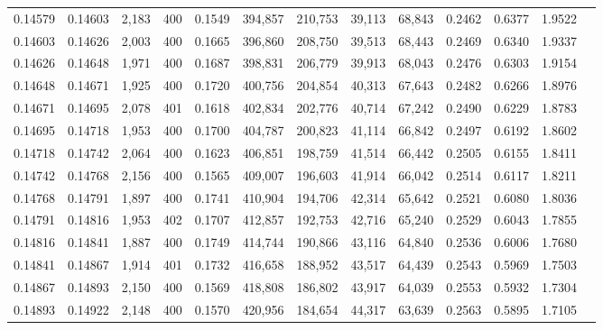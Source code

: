 \begin{tabular}{rrrrrrrrrrrrr}
0.14579 & 0.14603 &  2,183 &   400 &                                     0.1549 & 394,857 & 210,753 &  39,113 &  68,843 & 0.2462 & 0.6377 & 1.9522 \\
0.14603 & 0.14626 &  2,003 &   400 &                                     0.1665 & 396,860 & 208,750 &  39,513 &  68,443 & 0.2469 & 0.6340 & 1.9337 \\
0.14626 & 0.14648 &  1,971 &   400 &                                     0.1687 & 398,831 & 206,779 &  39,913 &  68,043 & 0.2476 & 0.6303 & 1.9154 \\
0.14648 & 0.14671 &  1,925 &   400 &                                     0.1720 & 400,756 & 204,854 &  40,313 &  67,643 & 0.2482 & 0.6266 & 1.8976 \\
0.14671 & 0.14695 &  2,078 &   401 &                                     0.1618 & 402,834 & 202,776 &  40,714 &  67,242 & 0.2490 & 0.6229 & 1.8783 \\
0.14695 & 0.14718 &  1,953 &   400 &                                     0.1700 & 404,787 & 200,823 &  41,114 &  66,842 & 0.2497 & 0.6192 & 1.8602 \\
0.14718 & 0.14742 &  2,064 &   400 &                                     0.1623 & 406,851 & 198,759 &  41,514 &  66,442 & 0.2505 & 0.6155 & 1.8411 \\
0.14742 & 0.14768 &  2,156 &   400 &                                     0.1565 & 409,007 & 196,603 &  41,914 &  66,042 & 0.2514 & 0.6117 & 1.8211 \\
0.14768 & 0.14791 &  1,897 &   400 &                                     0.1741 & 410,904 & 194,706 &  42,314 &  65,642 & 0.2521 & 0.6080 & 1.8036 \\
0.14791 & 0.14816 &  1,953 &   402 &                                     0.1707 & 412,857 & 192,753 &  42,716 &  65,240 & 0.2529 & 0.6043 & 1.7855 \\
0.14816 & 0.14841 &  1,887 &   400 &                                     0.1749 & 414,744 & 190,866 &  43,116 &  64,840 & 0.2536 & 0.6006 & 1.7680 \\
0.14841 & 0.14867 &  1,914 &   401 &                                     0.1732 & 416,658 & 188,952 &  43,517 &  64,439 & 0.2543 & 0.5969 & 1.7503 \\
0.14867 & 0.14893 &  2,150 &   400 &                                     0.1569 & 418,808 & 186,802 &  43,917 &  64,039 & 0.2553 & 0.5932 & 1.7304 \\
0.14893 & 0.14922 &  2,148 &   400 &                                     0.1570 & 420,956 & 184,654 &  44,317 &  63,639 & 0.2563 & 0.5895 & 1.7105 \\

\end{tabular}
